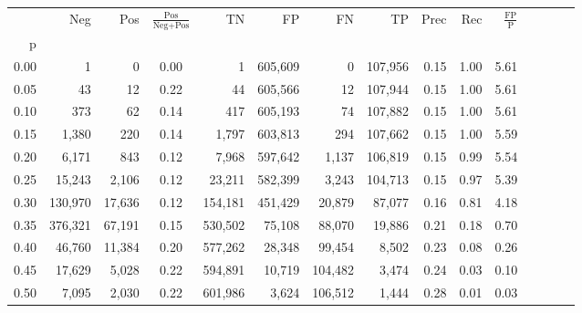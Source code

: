 \begin{tabular}{rrrcrrrrrrrrrrr}
\toprule
{} &      Neg &     Pos & $\frac{\text{Pos}}{\text{Neg}+\text{Pos}}$ &       TN &       FP &       FN &       TP &  Prec &   Rec & $\frac{\text{FP}}{\text{P}}$ \\
p    &          &         &                                            &          &          &          &          &       &       &                              \\
\midrule
0.00 &        1 &       0 &                                       0.00 &        1 &  605,609 &        0 &  107,956 &  0.15 &  1.00 &                         5.61 \\
0.05 &       43 &      12 &                                       0.22 &       44 &  605,566 &       12 &  107,944 &  0.15 &  1.00 &                         5.61 \\
0.10 &      373 &      62 &                                       0.14 &      417 &  605,193 &       74 &  107,882 &  0.15 &  1.00 &                         5.61 \\
0.15 &    1,380 &     220 &                                       0.14 &    1,797 &  603,813 &      294 &  107,662 &  0.15 &  1.00 &                         5.59 \\
0.20 &    6,171 &     843 &                                       0.12 &    7,968 &  597,642 &    1,137 &  106,819 &  0.15 &  0.99 &                         5.54 \\
0.25 &   15,243 &   2,106 &                                       0.12 &   23,211 &  582,399 &    3,243 &  104,713 &  0.15 &  0.97 &                         5.39 \\
0.30 &  130,970 &  17,636 &                                       0.12 &  154,181 &  451,429 &   20,879 &   87,077 &  0.16 &  0.81 &                         4.18 \\
0.35 &  376,321 &  67,191 &                                       0.15 &  530,502 &   75,108 &   88,070 &   19,886 &  0.21 &  0.18 &                         0.70 \\
0.40 &   46,760 &  11,384 &                                       0.20 &  577,262 &   28,348 &   99,454 &    8,502 &  0.23 &  0.08 &                         0.26 \\
0.45 &   17,629 &   5,028 &                                       0.22 &  594,891 &   10,719 &  104,482 &    3,474 &  0.24 &  0.03 &                         0.10 \\
0.50 &    7,095 &   2,030 &                                       0.22 &  601,986 &    3,624 &  106,512 &    1,444 &  0.28 &  0.01 &                         0.03 \\

\end{tabular}
